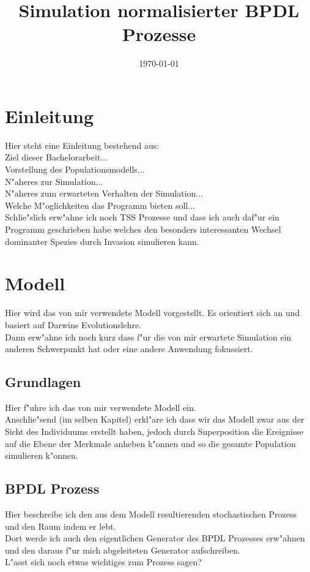 \documentclass[11pt, a4paper, german]{article}
\date{\today}
\title{Simulation normalisierter BPDL Prozesse}
\begin{document}
\maketitle
\tableofcontents

\clearpage


\section{Einleitung}
Hier steht eine Einleitung bestehend aus:\\
Ziel dieser Bachelorarbeit...\\
Vorstellung des Populationsmodells...\\
N"aheres zur Simulation... \\
N"aheres zum erwarteten Verhalten der Simulation...\\
Welche M"oglichkeiten das Programm bieten soll...\\
Schlie"slich erw"ahne ich noch TSS Prozesse und dass ich auch daf"ur ein Programm geschrieben habe welches den besonders interessanten Wechsel dominanter Spezies durch Invasion simulieren kann.


\clearpage
\section{Modell}
Hier wird das von mir verwendete Modell vorgestellt. Es orientiert sich an \cite{Champagnat20061127} und basiert auf Darwins Evolutionslehre.\\
Dann erw"ahne ich noch kurz dass f"ur die von mir erwartete Simulation ein anderen Schwerpunkt hat oder eine andere Anwendung fokussiert.

	\subsection{Grundlagen}
	Hier f"uhre ich das von mir verwendete Modell ein.\\
	Anschlie"send (im selben Kapitel) erkl"are ich dass wir das Modell zwar aus der Sicht des Individuums erstellt haben, jedoch durch Superposition die Ereignisse auf die Ebene der Merkmale anheben k"onnen und so die gesamte Population simulieren k"onnen.
	
	\subsection{BPDL Prozess}
	Hier beschreibe ich den aus dem Modell resultierenden stochastischen Prozess und den Raum indem er lebt. \\
	Dort werde ich auch den eigentlichen Generator des BPDL Prozesses erw"ahnen und den daraus f"ur mich abgeleiteten Generator aufschreiben.\\
	L"asst sich noch etwas wichtiges zum Prozess sagen?
	
\end{document}
